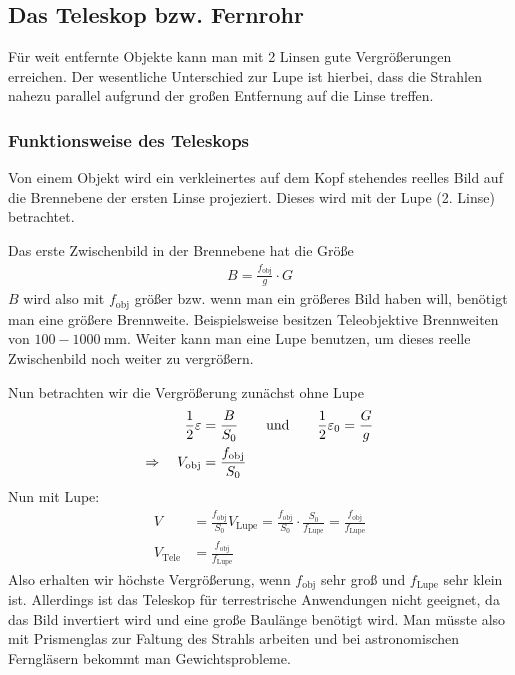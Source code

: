 
\subsection{Das Teleskop bzw. Fernrohr}
Für weit entfernte Objekte kann man mit 2 Linsen gute Vergrößerungen
erreichen. Der wesentliche Unterschied zur Lupe ist hierbei, dass die
Strahlen nahezu parallel aufgrund der großen Entfernung auf die Linse
treffen.

\subsubsection[Funktionsweise]{Funktionsweise des Teleskops}
Von einem Objekt wird ein verkleinertes auf dem Kopf stehendes reelles
Bild auf die Brennebene der ersten Linse projeziert. Dieses wird mit
der Lupe (2. Linse) betrachtet.

Das erste Zwischenbild in der Brennebene hat die Größe
\begin{align*}
  B = \frac{f_\text{obj}}{g}\cdot G
\end{align*}
$B$ wird also mit $f_\text{obj}$ größer bzw. wenn man ein größeres Bild
haben will, benötigt man eine größere Brennweite. Beispielsweise
besitzen Teleobjektive Brennweiten von
$\num{100}-\SI{1000}{\milli\meter}$.
Weiter kann man eine Lupe benutzen, um dieses reelle Zwischenbild noch
weiter zu vergrößern.

Nun betrachten wir die Vergrößerung zunächst ohne Lupe
\begin{align*}
  \frac{1}{2}\varepsilon &= \frac{B}{S_0} 
                    \qquad\text{und}\qquad\frac{1}{2}\varepsilon_0 =\frac{G}{g}\\
  \Rightarrow\quad V_\text{obj} &=\frac{f_\text{obj}}{S_0}
\end{align*}
Nun mit Lupe:
\begin{align*}
  V &= \frac{f_\text{obj}}{S_0}V_\text{Lupe}
      =\frac{f_\text{obj}}{S_0} \cdot \frac{S_0}{f_\text{Lupe}}
      =\frac{f_\text{obj}}{f_\text{Lupe}}\\
  V_\text{Tele} &=\frac{f_\text{obj}}{f_\text{Lupe}}
\end{align*}
Also erhalten wir höchste Vergrößerung, wenn $f_\text{obj}$ sehr groß und
$f_\text{Lupe}$ sehr klein ist. Allerdings ist das Teleskop für
terrestrische Anwendungen nicht geeignet, da das Bild invertiert wird
und eine große Baulänge benötigt wird. Man müsste also mit Prismenglas
zur Faltung des Strahls arbeiten und bei astronomischen Ferngläsern
bekommt man Gewichtsprobleme. 

